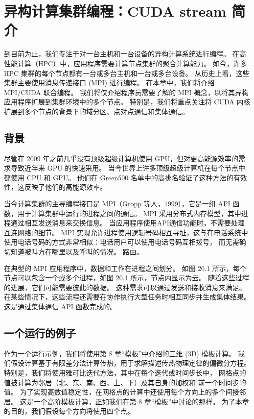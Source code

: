 \section{异构计算集群编程：CUDA stream 简介}
到目前为止，我们专注于对一台主机和一台设备的异构计算系统进行编程。 
在高性能计算（HPC）中，应用程序需要计算节点集群的聚合计算能力。 
如今，许多 HPC 集群的每个节点都有一台或多台主机和一台或多台设备。 
从历史上看，这些集群主要使用消息传递接口 (MPI) 进行编程。 在本章中，我们将介绍 MPI/CUDA 联合编程。 
我们将仅介绍程序员需要了解的 MPI 概念，以将其异构应用程序扩展到集群环境中的多个节点。 
特别是，我们将重点关注将 CUDA 内核扩展到多个节点的背景下的域分区、点对点通信和集体通信。

\subsection{背景}
尽管在 2009 年之前几乎没有顶级超级计算机使用 GPU，但对更高能源效率的需求导致近年来 GPU 的快速采用。 
当今世界上许多顶级超级计算机在每个节点中都使用 CPU 和 GPU。 
他们在 Green500 名单中的高排名验证了这种方法的有效性，这反映了他们的高能源效率。

当今计算集群的主导编程接口是 MPI（Gropp 等人，1999），它是一组 API 函数，用于计算集群中运行的进程之间的通信。 
MPI 采用分布式内存模型，其中进程通过相互发送消息来交换信息。 当应用程序使用API通信功能时，不需要处理互连网络的细节。 
MPI 实现允许进程使用逻辑号码相互寻址，这与在电话系统中使用电话号码的方式非常相似：电话用户可以使用电话号码互相拨号，
而无需确切知道被叫方在哪里以及呼叫的情况。 路由。

在典型的 MPI 应用程序中，数据和工作在进程之间划分。 
如图 20.1 所示，每个节点可以包含一个或多个进程，如图 20.1 所示，节点内显示为云。 
随着这些过程的进展，它们可能需要彼此的数据。 这种需求可以通过发送和接收消息来满足。 
在某些情况下，这些流程还需要在协作执行大型任务时相互同步并生成集体结果。 这是通过集体通信 API 函数完成的。

\subsection{一个运行的例子}
作为一个运行示例，我们将使用第 8 章“模板”中介绍的三维 (3D) 模板计算。 
我们假设计算基于有限差分法计算传热，用于求解描述传热物理定律的偏微分方程。 
特别是，我们将使用雅可比迭代方法，其中在每个迭代或时间步长中，
网格点的值被计算为邻居（北、东、南、西、上、下）及其自身的加权和 前一个时间步的值。 
为了实现高数值稳定性，在网格点的计算中还使用每个方向上的多个间接邻居。 
这是一个高阶模板计算，正如我们在第 8 章“模板”中讨论的那样。 为了本章的目的，我们假设每个方向将使用四个点。

